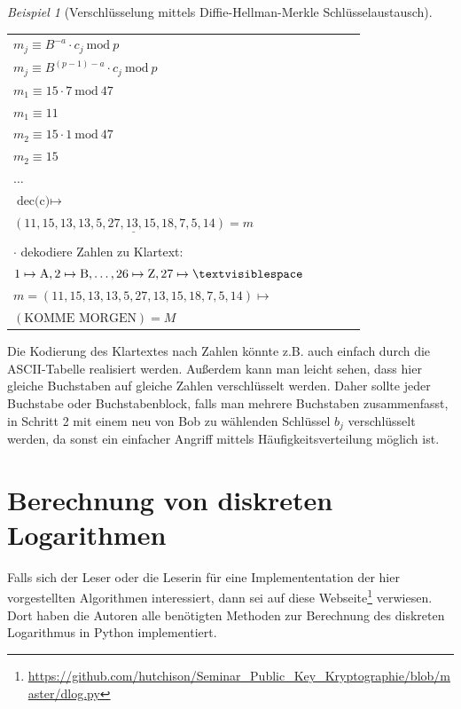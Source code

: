 \documentclass[
  a4paper,
  11pt,
]{scrartcl}
\theoremstyle{plain}
\theoremstyle{definition}
\theoremstyle{remark}
\newtheorem{beispiel}{Beispiel}
\newcommand{\Mod}[1]{\ \mathrm{mod}\ #1}
\begin{document}
\begin{beispiel}[Verschlüsselung mittels Diffie-Hellman-Merkle Schlüsselaustausch]
\begin{center}
\begin{tabularx}{\textwidth}{lXcXl}
      $m_j \equiv B^{-a} \cdot c_j \Mod{p}$ & & & & \\
      $m_j \equiv B^{(p-1)-a} \cdot c_j \Mod{p}$ & & & & \\
      $m_1 \equiv 15 \cdot 7 \Mod{47}$ & & & & \\
      $m_1 \equiv 11$ & & & & \\
      $m_2 \equiv 15 \cdot 1 \Mod{47}$ & & & & \\
      $m_2 \equiv 15$ & & & & \\
      $\dots$ & & & & \\
      $\text{dec(c)} \mapsto$ & & & & \\
      $\underline{(11, 15, 13, 13, 5, 27, 13, 15, 18, 7, 5, 14) = m}$ & & & & \\
      & & & & \\
      $\cdot$ dekodiere Zahlen zu Klartext: & & & & \\
      $1 \mapsto \text{A}, 2 \mapsto \text{B}, \ldots, 26 \mapsto \text{Z}, 27 \mapsto \textvisiblespace$ & & & & \\
      $m = (11, 15, 13, 13, 5, 27, 13, 15, 18, 7, 5, 14) \mapsto$ & & & & \\
      $(\text{KOMME MORGEN}) = M$ & & & & \\\midrule
    \end{tabularx}
  \end{center}
  Die Kodierung des Klartextes nach Zahlen könnte z.B. auch einfach durch die
  ASCII-Tabelle realisiert werden. Außerdem kann man leicht sehen, dass hier
  gleiche Buchstaben auf gleiche Zahlen verschlüsselt werden. Daher sollte
  jeder Buchstabe oder Buchstabenblock, falls man mehrere Buchstaben
  zusammenfasst, in Schritt 2 mit einem neu von Bob zu wählenden Schlüssel $b_j$
  verschlüsselt werden, da sonst ein einfacher Angriff mittels
  Häufigkeitsverteilung möglich ist.
\end{beispiel}


\section{Berechnung von diskreten Logarithmen}
\label{sec:berechnung_von_diskreten_logarithmen}

Falls sich der Leser oder die Leserin für eine Implemententation der hier
vorgestellten Algorithmen interessiert, dann sei auf diese
Webseite\footnote{\url{https://github.com/hutchison/Seminar_Public_Key_Kryptographie/blob/master/dlog.py}}
verwiesen. Dort haben die Autoren alle benötigten Methoden zur Berechnung des
diskreten Logarithmus in Python implementiert.
\end{document}
